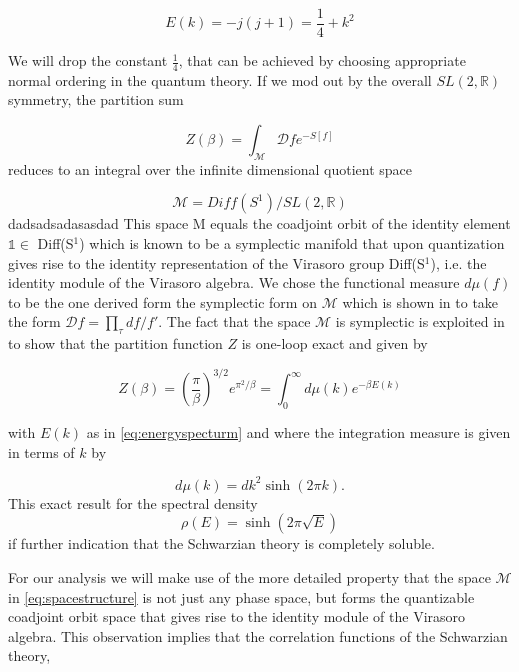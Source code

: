 \begin{equation}
E(k) = -j(j+1) = \frac{1}{4} + k^2
\label{eq:energyspecturm}
\end{equation}

We will drop the constant $\frac{1}{4}$, that can be achieved by choosing appropriate normal ordering in the quantum theory. If we mod out by the overall $SL(2,\mathbb{R})$ symmetry, the partition sum

\begin{equation}
Z(\beta) = \int_\mathcal{M}{\mathcal{D}f e^{-S[f]}}
\end{equation}
reduces to an integral over the infinite dimensional quotient space

\begin{equation}
\mathcal{M} = Diff(S^1)/SL(2,\mathbb{R})	
\label{eq:spacestructure}
\end{equation}
dadsadsadasasdad
This space M equals the coadjoint orbit of the identity element $\mathbb{1} \in$ Diff(S$^1$) which is known to be a symplectic manifold that upon quantization gives rise to the identity representation
of the Virasoro group Diff(S$^1$), i.e. the identity module of the Virasoro algebra. We chose the functional measure $d\mu(f)$ to be the one derived form the symplectic form on $\mathcal{M}$ which is shown in \cite{Alekseev90}\cite{Bagrets16} to take the form $\mathcal{D}f = \prod_\tau df/f'$.
The fact that the space $\mathcal{M}$ is symplectic is exploited in \cite{Witten17} to show that the partition function $Z$ is one-loop exact and given by

\begin{equation}
Z(\beta) = \left(\frac{\pi}{\beta}\right)^{3/2} e^{\pi^2/\beta} = \int_0^\infty{d\mu(k)e^{-\beta E(k)}}
\end{equation}

with $E(k)$ as in \eqref{eq:energyspecturm} and where the integration measure is given in terms of $k$ by

\begin{equation}
d\mu(k) = dk^2\sinh(2\pi k).
\end{equation}
This exact result for the spectral density 
\begin{equation}
\rho(E) = \sinh(2\pi\sqrt{E})
\label{eq:spectraldensity}
\end{equation}
if further indication that the Schwarzian theory is completely soluble. 

For our analysis we will make use of the more detailed property that the space $\mathcal{M}$ in \eqref{eq:spacestructure} is not just any phase space, but forms the quantizable coadjoint orbit space that gives rise to the identity module of the Virasoro algebra. This observation implies that the correlation functions of the Schwarzian theory,

